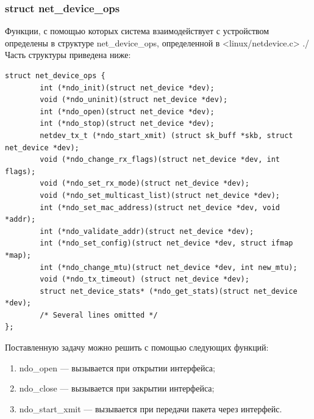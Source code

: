 \documentclass[14pt, a4paper]{extarticle}
\begin{document}
\subsubsection{struct net\_device\_ops}
\indent Функции, с помощью которых система взаимодействует с устройством определены в структуре net\_device\_ops, определенной в <linux/netdevice.c> \cite{netdevice}./ Часть структуры приведена ниже:
\begin{lstlisting}[caption=net\_device\_ops]
struct net_device_ops {
        int (*ndo_init)(struct net_device *dev);
        void (*ndo_uninit)(struct net_device *dev);
        int (*ndo_open)(struct net_device *dev);
        int (*ndo_stop)(struct net_device *dev);
        netdev_tx_t (*ndo_start_xmit) (struct sk_buff *skb, struct net_device *dev);
        void (*ndo_change_rx_flags)(struct net_device *dev, int flags);
        void (*ndo_set_rx_mode)(struct net_device *dev);
        void (*ndo_set_multicast_list)(struct net_device *dev);
        int (*ndo_set_mac_address)(struct net_device *dev, void *addr);
        int (*ndo_validate_addr)(struct net_device *dev);
        int (*ndo_set_config)(struct net_device *dev, struct ifmap *map);
        int (*ndo_change_mtu)(struct net_device *dev, int new_mtu);
        void (*ndo_tx_timeout) (struct net_device *dev);
        struct net_device_stats* (*ndo_get_stats)(struct net_device *dev);
        /* Several lines omitted */
};
\end{lstlisting}
Поставленную задачу можно решить с помощью следующих функций:
\begin{enumerate}
	\item ndo\_open --- вызывается при открытии интерфейса;
	\item ndo\_close --- вызывается при закрытии интерфейса;
	\item ndo\_start\_xmit --- вызывается при передачи пакета через интерфейс.
\end{enumerate}
\end{document}
